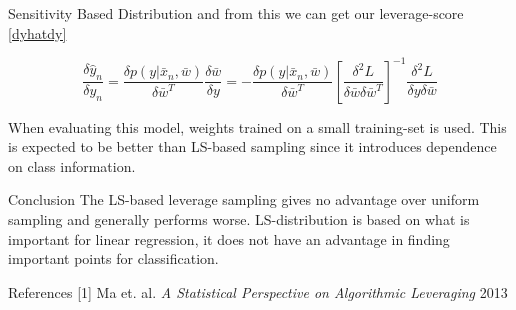 \documentclass{beamer}
\newenvironment{pblock}{\begin{minipage}[b]{\linewidth}
	\begin{block}}{\end{block} 	\end{minipage}\vspace*{15pt}}
\begin{document}
{\begin{columns}[T]
\begin{column}{.69\linewidth}
\begin{columns}[t]
\begin{column}{.5\linewidth}
\begin{pblock}{Sensitivity Based Distribution}
    	and from this we can get our leverage-score \eqref{dyhatdy}
    	
    	\begin{equation*}
    		\frac{\delta \hat{y}_n}{\delta y_n}=\frac{\delta p(y|\bar{x}_n,\bar{w})}{\delta \bar{w}^T} \frac{\delta \bar{w}}{\delta y} = - \frac{\delta p(y|\bar{x}_n,\bar{w})}{\delta \bar{w}^T} \left[ \frac{\delta^2 L}{\delta \bar{w} \delta \bar{w}^T} \right]^{-1} \frac{\delta^2 L}{\delta y \delta \bar{w}}
    	\end{equation*}
    	
    	When evaluating this model, weights trained on a small training-set is used. This is expected to be better than LS-based sampling since it introduces dependence on class information.
    	\end{pblock}
    	
    
    
    
    \begin{pblock}{Conclusion}
    The LS-based leverage sampling gives no advantage over uniform sampling and generally performs worse. LS-distribution is based on what is important for linear regression, it does not have an advantage in finding important points for classification.
    \end{pblock}
    			
    \begin{pblock}{References}
   		[1] Ma et. al. \emph{A Statistical Perspective on Algorithmic Leveraging} 2013
    \end{pblock}
    
    \end{column}
    \end{columns}
    \end{column}
  \end{columns}
	
}
\end{document}
